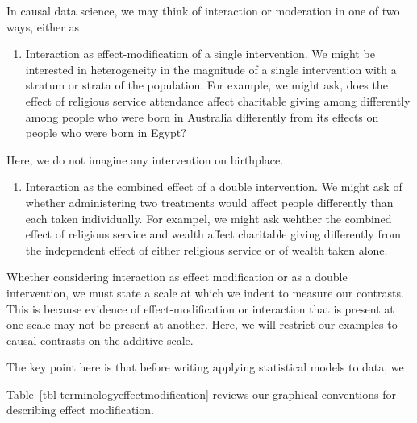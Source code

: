 \documentclass[
  single column]{article}
\providecommand{\tightlist}{%
  \setlength{\itemsep}{0pt}\setlength{\parskip}{0pt}}\usepackage{longtable,booktabs,array}
\begin{document}
In causal data science, we may think of interaction or moderation in one
of two ways, either as

\begin{enumerate}
\def\labelenumi{(\arabic{enumi})}
\tightlist
\item
  Interaction as effect-modification of a single intervention. We might
  be interested in heterogeneity in the magnitude of a single
  intervention with a stratum or strata of the population. For example,
  we might ask, does the effect of religious service attendance affect
  charitable giving among differently among people who were born in
  Australia differently from its effects on people who were born in
  Egypt?
\end{enumerate}

Here, we do not imagine any intervention on birthplace.

\begin{enumerate}
\def\labelenumi{(\arabic{enumi})}
\setcounter{enumi}{1}
\tightlist
\item
  Interaction as the combined effect of a double intervention. We might
  ask of whether administering two treatments would affect people
  differently than each taken individually. For exampel, we might ask
  wehther the combined effect of religious service and wealth affect
  charitable giving differently from the independent effect of either
  religious service or of wealth taken alone.
\end{enumerate}

Whether considering interaction as effect modification or as a double
intervention, we must state a scale at which we indent to measure our
contrasts. This is because evidence of effect-modification or
interaction that is present at one scale may not be present at another.
Here, we will restrict our examples to causal contrasts on the additive
scale.

The key point here is that before writing applying statistical models to
data, we

Table~\ref{tbl-terminologyeffectmodification} reviews our graphical
conventions for describing effect modification.

\begin{table}

\caption{\label{tbl-terminologyeffectmodification}}

\centering{

\captionsetup{labelsep=none}

\terminologyeffectmodification

}

\end{table}%
\end{document}
